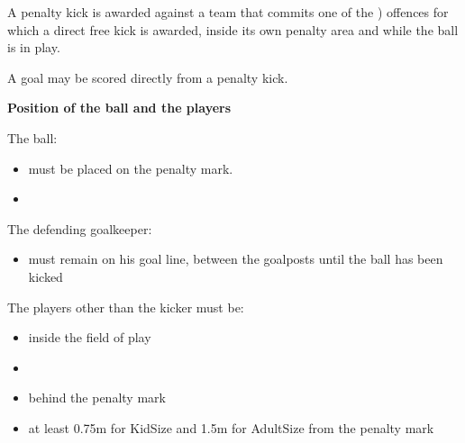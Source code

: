 \clearpage
\sffamily
{\bfseries \color[rgb]{0.4,0.4,0.4}{Law 14 -- The Penalty Kick}}
{}

\bigskip
A penalty kick is awarded against a team that commits one of the 
) offences for which a direct free kick is awarded,
inside its own penalty area and while the ball is in play.

\bigskip

A goal may be scored directly from a penalty kick.

\bigskip


\bigskip

{\bfseries Position of the ball and the players }

\headlinebox

The ball:

\begin{itemize}
\item must be placed on the penalty mark.
\end{itemize}


\begin{itemize}
\item {}
\end{itemize}

The defending goalkeeper:

\begin{itemize}
\item must remain on his goal line,  between the goalposts until the ball has been kicked 
\end{itemize}

The players other than the kicker must be:

\bigskip
\begin{itemize}
\item inside the field of play
\item {}
\item behind the penalty mark
\item at least 0.75m for KidSize and 1.5m for AdultSize from the
      penalty mark 
\end{itemize}

